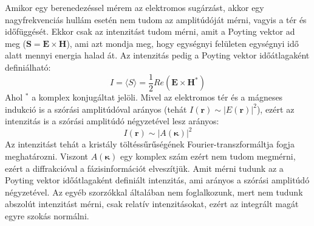 \documentclass[../main.tex]{subfiles}
\begin{document}
Amikor egy berenedezéssel mérem az elektromos sugárzást, akkor egy nagyfrekvenciás hullám esetén nem tudom az amplitúdóját mérni, vagyis a tér és időfüggését. Ekkor csak az intenzitást tudom mérni, amit a 
Poyting vektor ad meg ($\mathbf{S} = \mathbf{E} \times \mathbf{H}$), ami azt mondja meg, hogy egységnyi felületen egységnyi idő alatt mennyi energia halad át. Az intenzitás pedig a Poyting vektor időátlagaként definiálható:
\begin{equation}
    I = \langle S \rangle = \frac{1}{2} Re(\mathbf{E} \times \mathbf{H}^*)
\end{equation}
Ahol $^*$ a komplex konjugáltat jelöli. Mivel az elektromos tér és a mágneses indukció is a szórási amplitúdóval arányos (tehát $I(\mathbf{r}) \sim |E(\mathbf{r})|^2$), ezért az intenzitás is a szórási amplitúdó négyzetével lesz arányos:
\begin{equation}
    I(\boldsymbol{r}) \sim |A(\boldsymbol{\kappa})|^2
\end{equation}
Az intenzitást tehát a kristály töltéssűrűségének Fourier-transzformáltja fogja meghatározni. Viszont $A(\boldsymbol{\kappa})$ egy komplex szám ezért nem tudom megmérni, ezért a diffrakcióval a fázisinformációt
elveszítjük. Amit mérni tudunk az a Poyting vektor időátlagaként definiált intenzitás, ami arányos a szórási amplitúdó négyzetével. Az egyéb szorzókkal általában nem foglalkozunk, mert nem tudunk abszolút
intenzitást mérni, csak relatív intenzitásokat, ezért az integrált magát egyre szokás normálni.
\end{document}
